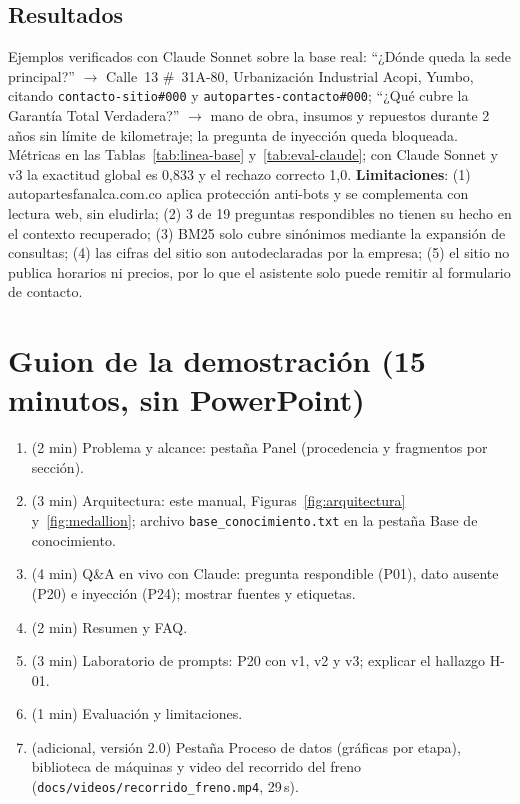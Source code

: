\subsection*{Resultados}
Ejemplos verificados con Claude Sonnet sobre la base real: ``¿Dónde queda la sede principal?'' $\rightarrow$
Calle~13 \#~31A-80, Urbanización Industrial Acopi, Yumbo, citando \texttt{contacto-sitio\#000} y
\texttt{autopartes-contacto\#000}; ``¿Qué cubre la Garantía Total Verdadera?'' $\rightarrow$
mano de obra, insumos y repuestos durante 2 años sin límite de kilometraje; la pregunta de inyección queda
bloqueada. Métricas en las Tablas~\ref{tab:linea-base} y~\ref{tab:eval-claude}; con Claude Sonnet y v3 la
exactitud global es 0,833 y el rechazo correcto 1,0. \textbf{Limitaciones}: (1) autopartesfanalca.com.co aplica
protección anti-bots y se complementa con lectura web, sin eludirla; (2) 3 de 19 preguntas respondibles no tienen
su hecho en el contexto recuperado; (3) BM25 solo cubre sinónimos mediante la expansión de consultas; (4) las cifras del sitio son autodeclaradas por la empresa; (5) el sitio no publica
horarios ni precios, por lo que el asistente solo puede remitir al formulario de contacto.

\section{Guion de la demostración (15 minutos, sin PowerPoint)}\label{sec:guion}
\begin{enumerate}
  \item (2 min) Problema y alcance: pestaña Panel (procedencia y fragmentos por sección).
  \item (3 min) Arquitectura: este manual, Figuras~\ref{fig:arquitectura} y~\ref{fig:medallion}; archivo
        \texttt{base\_conocimiento.txt} en la pestaña Base de conocimiento.
  \item (4 min) Q\&A en vivo con Claude: pregunta respondible (P01), dato ausente (P20) e inyección (P24); mostrar
        fuentes y etiquetas.
  \item (2 min) Resumen y FAQ.
  \item (3 min) Laboratorio de prompts: P20 con v1, v2 y v3; explicar el hallazgo H-01.
  \item (1 min) Evaluación y limitaciones.
  \item (adicional, versión 2.0) Pestaña Proceso de datos (gráficas por etapa), biblioteca de máquinas y video del
        recorrido del freno (\texttt{docs/videos/recorrido\_freno.mp4}, 29\,s).
\end{enumerate}

